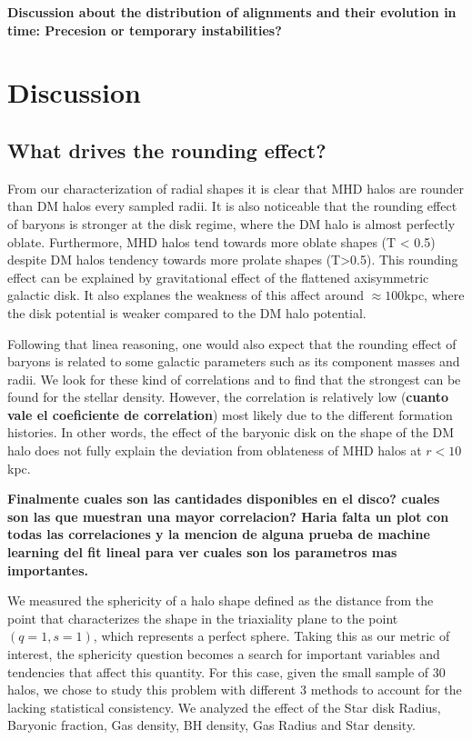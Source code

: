 \documentclass[a4paper,fleqn,usenatbib]{mnras}
\begin{document}
\textbf{Discussion about the distribution of alignments and their
  evolution in time: Precesion or temporary instabilities?} 

\section{Discussion}


\subsection{What drives the rounding effect?}

From our characterization of radial shapes it is clear that
MHD halos are rounder than DM halos every sampled radii. 
It is also noticeable that the rounding effect of baryons is stronger
at the disk regime, where the DM halo is almost perfectly oblate. 
Furthermore, MHD halos tend towards more oblate shapes (T < 0.5)
despite DM halos tendency towards more prolate shapes (T>0.5). 
This rounding effect can be explained by gravitational effect of the
flattened axisymmetric galactic disk. 
It also explanes the weakness of this affect around $\approx 100$kpc,
where the disk potential is weaker compared to the DM halo potential. 

Following that linea reasoning, one would also expect that the rounding
effect of baryons is related to some  galactic parameters such as its
component masses and radii. 
We look for these kind of correlations and to find that the strongest
can be found for the stellar density.
However, the correlation is relatively low ({\bf cuanto vale el
  coeficiente de correlation}) most likely due to the different
formation histories.
In other words, the effect of the baryonic disk on the shape of the DM halo
does not fully explain the deviation from oblateness of MHD halos at
$r<10$kpc. 

{\bf Finalmente cuales son las cantidades disponibles en el disco?
  cuales son las que muestran una mayor correlacion? Haria falta un
  plot con todas las correlaciones y la mencion de alguna prueba de
  machine learning del fit lineal para ver cuales son los parametros
  mas importantes.}
  
  We measured the sphericity of a halo shape defined as the distance 
  from the point that characterizes the shape in the triaxiality plane
  to the point $(q=1,s=1)$, which represents a perfect sphere. Taking this 
  as our metric of interest, the sphericity question becomes a search for
  important variables and tendencies that affect this quantity. For this case,
  given the small sample of 30 halos, we chose to study this problem with different 
  3 methods to account for the lacking statistical consistency. We analyzed the effect
  of the Star disk Radius, Baryonic fraction, Gas density, BH density, Gas Radius and
  Star density.\\
   
\end{document}
